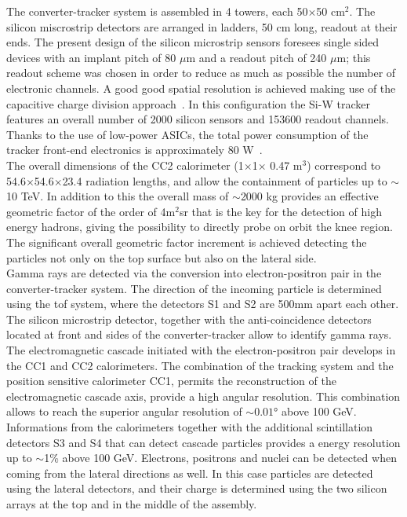 The converter-tracker system is assembled in 4 towers, each 50$\times$50
cm$^2$. The silicon miscrostrip detectors are arranged in ladders, 50 cm long,
readout at their ends.  The present design of the silicon microstrip sensors
foresees single sided devices with an implant pitch of 80 $\mu$m and a readout
pitch of 240 $\mu$m; this readout scheme was chosen in order to reduce as much
as possible the number of electronic channels. A good good spatial resolution is
achieved making use of the capacitive charge division
approach~\cite{KOTZ1985481}.  In this configuration the Si-W tracker features an
overall number of 2000 silicon sensors and 153600 readout channels. Thanks to
the use of low-power ASICs, the total power consumption of the tracker front-end
electronics is approximately 80 W~\cite{Galper:2011bc}.\\
The overall dimensions of the CC2 calorimeter (1$\times$1$\times$ 0.47 m$^3$)
correspond to 54.6$\times$54.6$\times$23.4 radiation lengths, and allow the
containment of particles up to $\sim$10 TeV. In addition to this the overall
mass of $\sim$2000 kg provides an effective geometric factor of the order of
4m$^2$sr that is the key for the detection of high energy hadrons, giving the
possibility to directly probe on orbit the knee region. The significant overall
geometric factor increment is achieved detecting the particles not only on the
top surface but also on the lateral side.\\

Gamma rays are detected via the conversion into electron-positron pair in the
converter-tracker system. The direction of the incoming particle is determined
using the \gls{tof} system, where the detectors S1 and S2 are 500mm apart each
other. The silicon microstrip detector, together with the anti-coincidence
detectors located at front and sides of the converter-tracker allow to identify
gamma rays. The electromagnetic cascade initiated with the electron-positron
pair develops in the CC1 and CC2 calorimeters.  The combination of the tracking
system and the position sensitive calorimeter CC1, permits the reconstruction of
the electromagnetic cascade axis, provide a high angular resolution. This
combination allows to reach the superior angular resolution of
$\sim\ang{0.01}$ above 100 GeV. Informations from the calorimeters together
with the additional scintillation detectors S3 and S4 that can detect cascade
particles provides a energy resolution up to $\sim$1\% above 100 GeV. Electrons,
positrons and nuclei can be detected when coming from the lateral directions as
well. In this case particles are detected using the lateral detectors, and their
charge is determined using the two silicon arrays at the top and in the middle
of the assembly.\\

